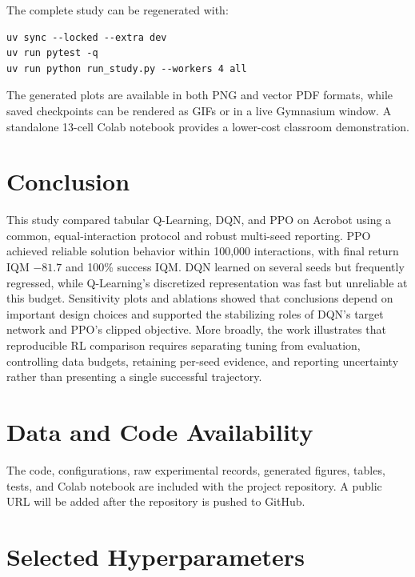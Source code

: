 \documentclass[11pt]{article}
\begin{document}
The complete study can be regenerated with:
\begin{verbatim}
uv sync --locked --extra dev
uv run pytest -q
uv run python run_study.py --workers 4 all
\end{verbatim}
The generated plots are available in both PNG and vector PDF formats, while saved
checkpoints can be rendered as GIFs or in a live Gymnasium window. A standalone
13-cell Colab notebook provides a lower-cost classroom demonstration.

\section{Conclusion}

This study compared tabular Q-Learning, DQN, and PPO on Acrobot using a common,
equal-interaction protocol and robust multi-seed reporting. PPO achieved reliable
solution behavior within 100,000 interactions, with final return IQM $-81.7$ and
100\% success IQM. DQN learned on several seeds but frequently regressed, while
Q-Learning's discretized representation was fast but unreliable at this budget.
Sensitivity plots and ablations showed that conclusions depend on important design
choices and supported the stabilizing roles of DQN's target network and PPO's
clipped objective. More broadly, the work illustrates that reproducible RL
comparison requires separating tuning from evaluation, controlling data budgets,
retaining per-seed evidence, and reporting uncertainty rather than presenting a
single successful trajectory.

\section*{Data and Code Availability}

The code, configurations, raw experimental records, generated figures, tables,
tests, and Colab notebook are included with the project repository. A public URL
will be added after the repository is pushed to GitHub.




\appendix
\section{Selected Hyperparameters}
\end{document}
